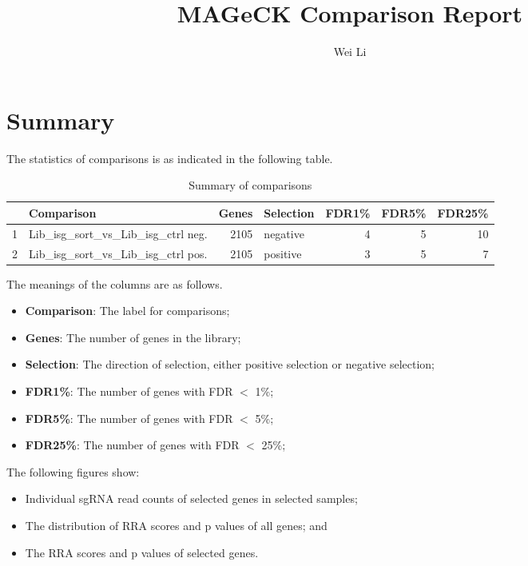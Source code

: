 \documentclass{article}
\begin{document}

\title{MAGeCK Comparison Report}
\author{Wei Li}

\maketitle


\tableofcontents

\section{Summary}


The statistics of comparisons is as indicated in the following table. 

\begin{table}[ht]
\centering
\begin{tabular}{rlrlrrr}
  \hline
 & Comparison & Genes & Selection & FDR1\% & FDR5\% & FDR25\% \\ 
  \hline
1 & Lib\_isg\_sort\_vs\_Lib\_isg\_ctrl neg. & 2105 & negative & 4 & 5 & 10 \\ 
  2 & Lib\_isg\_sort\_vs\_Lib\_isg\_ctrl pos. & 2105 & positive & 3 & 5 & 7 \\ 
   \hline
\end{tabular}
\caption{Summary of comparisons} 
\label{tab:one}
\end{table}
The meanings of the columns are as follows.

\begin{itemize}
\item \textbf{Comparison}: The label for comparisons;
\item \textbf{Genes}: The number of genes in the library;
\item \textbf{Selection}: The direction of selection, either positive selection or negative selection;
\item \textbf{FDR1\%}: The number of genes with FDR $<$ 1\%;
\item \textbf{FDR5\%}: The number of genes with FDR $<$ 5\%;
\item \textbf{FDR25\%}: The number of genes with FDR $<$ 25\%;
\end{itemize}

The following figures show:

\begin{itemize}
\item Individual sgRNA read counts of selected genes in selected samples; 
\item The distribution of RRA scores and p values of all genes; and
\item The RRA scores and p values of selected genes.
\end{itemize}
\end{document}
